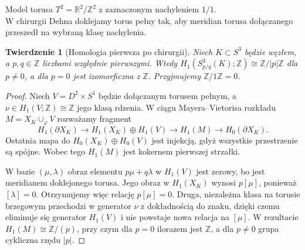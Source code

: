 \documentclass[11pt,a4paper]{report}
\numberwithin{equation}{section}
\theoremstyle{plain}
\newtheorem{twierdzenie}{Twierdzenie}[section]
\theoremstyle{definition}
\theoremstyle{remark}
\begin{document}
\medskip
\begin{center}

{\footnotesize Model torusa $T^2=\mathbb R^2/\mathbb Z^2$ z zaznaczonym nachyleniem $1/1$. \\
W chirurgii Dehna doklejamy torus pełny tak, aby meridian torusa dołączanego \\
przeszedł na wybraną klasę nachylenia.}
\end{center}
\medskip

\begin{twierdzenie}[Homologia pierwsza po chirurgii]
Niech $K\subset S^3$ będzie węzłem, a $p,q\in\mathbb Z$
liczbami względnie pierwszymi. Wtedy
$H_1(S^3_{p/q}(K);\mathbb Z)\cong\mathbb Z/|p|\mathbb Z$
dla $p\ne0$, a dla $p=0$ jest izomorficzna z $\mathbb Z$.
Przyjmujemy $\mathbb Z/1\mathbb Z=0$.
\end{twierdzenie}

\begin{proof}
Niech $V=D^2\times S^1$ będzie dołączanym torusem pełnym,
a $\nu\in H_1(V;\mathbb Z)\cong\mathbb Z$ jego klasą rdzenia.
W ciągu Mayera--Vietorisa rozkładu
$M=X_K\cup_\varphi V$ rozważamy fragment
\[
H_1(\partial X_K)\longrightarrow H_1(X_K)\oplus H_1(V)
\longrightarrow H_1(M)\longrightarrow
H_0(\partial X_K).
\]
Ostatnia mapa do $H_0(X_K)\oplus H_0(V)$ jest injekcją,
gdyż wszystkie przestrzenie są spójne. Wobec tego $H_1(M)$
jest kokernem pierwszej strzałki.

W bazie $(\mu,\lambda)$ obraz elementu $p\mu+q\lambda$
w $H_1(V)$ jest zerowy, bo jest meridianem doklejonego
torusa. Jego obraz w $H_1(X_K)$ wynosi $p[\mu]$,
ponieważ $[\lambda]=0$. Otrzymujemy więc relację
$p[\mu]=0$. Druga, niezależna klasa na torusie brzegowym
przechodzi w generator $\nu$ z dokładnością do znaku,
dzięki czemu eliminuje się generator $H_1(V)$ i nie
powstaje nowa relacja na $[\mu]$. W rezultacie
$H_1(M)\cong\mathbb Z/(p)$, przy czym dla $p=0$
ilorazem jest $\mathbb Z$, a dla $p\ne0$ grupa cykliczna
rzędu $|p|$.
\end{proof}
\end{document}
